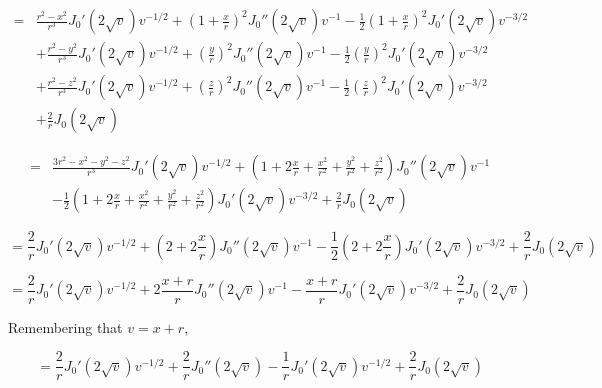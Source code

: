 \documentclass{article}
\begin{document}
\begin{equation*}
\begin{aligned}
=&\frac{r^2-x^2}{r^3} J_0'(2\sqrt{v}) v^{-1/2} + (1+\frac{x}{r})^2 J_0''(2\sqrt{v}) v^{-1} - \frac{1}{2} (1+\frac{x}{r})^2 J_0'(2\sqrt{v}) v^{-3/2} \\
&+ \frac{r^2-y^2}{r^3} J_0'(2\sqrt{v}) v^{-1/2} + \left(\frac{y}{r}\right)^2 J_0''(2\sqrt{v}) v^{-1} - \frac{1}{2} \left(\frac{y}{r}\right)^2 J_0'(2\sqrt{v}) v^{-3/2} \\
&+ \frac{r^2-z^2}{r^3} J_0'(2\sqrt{v}) v^{-1/2} + \left(\frac{z}{r}\right)^2 J_0''(2\sqrt{v}) v^{-1} - \frac{1}{2} \left(\frac{z}{r}\right)^2 J_0'(2\sqrt{v}) v^{-3/2} \\
&+ \frac{2}{r} J_0(2\sqrt{v})
\end{aligned}
\end{equation*}

\begin{equation*}
\begin{aligned}
=&\frac{3r^2-x^2-y^2-z^2}{r^3} J_0'(2\sqrt{v}) v^{-1/2} + (1+2\frac{x}{r} +\frac{x^2}{r^2} + \frac{y^2}{r^2} + \frac{z^2}{r^2}) J_0''(2\sqrt{v}) v^{-1} \\
&- \frac{1}{2} (1+2\frac{x}{r} +\frac{x^2}{r^2}+ \frac{y^2}{r^2} + \frac{z^2}{r^2}) J_0'(2\sqrt{v}) v^{-3/2}
+ \frac{2}{r} J_0(2\sqrt{v})
\end{aligned}
\end{equation*}

\begin{equation*}
=\frac{2}{r} J_0'(2\sqrt{v}) v^{-1/2} + (2+2\frac{x}{r}) J_0''(2\sqrt{v}) v^{-1} - \frac{1}{2} (2+2\frac{x}{r}) J_0'(2\sqrt{v}) v^{-3/2} + \frac{2}{r} J_0(2\sqrt{v})
\end{equation*}

\begin{equation*}
=\frac{2}{r} J_0'(2\sqrt{v}) v^{-1/2} + 2\frac{x+r}{r} J_0''(2\sqrt{v}) v^{-1} - \frac{x+r}{r} J_0'(2\sqrt{v}) v^{-3/2}
+ \frac{2}{r} J_0(2\sqrt{v})
\end{equation*}

Remembering that $v=x+r$,


\begin{equation*}
=\frac{2}{r} J_0'(2\sqrt{v}) v^{-1/2} + \frac{2}{r} J_0''(2\sqrt{v}) - \frac{1}{r} J_0'(2\sqrt{v}) v^{-1/2}
+ \frac{2}{r} J_0(2\sqrt{v})
\end{equation*}
\end{document}

